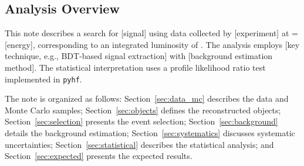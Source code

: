 \subsection{Analysis Overview}
\label{sec:intro:overview}

This note describes a search for [signal] using data collected by [experiment]
at \sqrts = [energy], corresponding to an integrated luminosity of \lumival.
The analysis employs [key technique, e.g., BDT-based signal extraction] with
[background estimation method]. The statistical interpretation uses a
profile likelihood ratio test implemented in \texttt{pyhf}.

The note is organized as follows: Section~\ref{sec:data_mc} describes the
data and Monte Carlo samples; Section~\ref{sec:objects} defines the
reconstructed objects; Section~\ref{sec:selection} presents the event
selection; Section~\ref{sec:background} details the background estimation;
Section~\ref{sec:systematics} discusses systematic uncertainties;
Section~\ref{sec:statistical} describes the statistical analysis;
and Section~\ref{sec:expected} presents the expected results.
